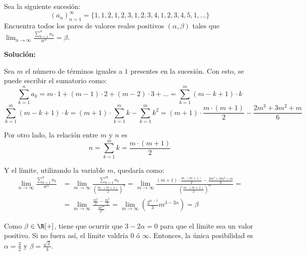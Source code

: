 \documentclass[../../main.tex]{subfiles}
\begin{document}
  \begin{shaded}
    Sea la siguiente sucesión:
    $$
    (a_n)_{n = 1}^\infty = \{1, 1, 2, 1, 2, 3, 1, 2, 3, 4, 1, 2, 3, 4, 5, 1, ...\}
    $$
    Encuentra todos los pares de valores reales positivos $(\alpha, \beta)$ tales que $ \displaystyle\lim_{n \to \infty} \displaystyle\frac{\displaystyle\sum_{k = 1}^n a_k}{n^\alpha} = \beta$.
  \end{shaded}

  \textbf{Solución:}

  Sea $m$ el número de términos iguales a $1$ presentes en la sucesión. Con esto, se puede escribir el sumatorio como:
  $$
  \sum_{k = 1}^n a_k =
  m \cdot 1 + (m - 1) \cdot 2 + (m - 2) \cdot 3 + \dots =
  \sum_{k = 1}^m (m - k + 1) \cdot k
  $$
  $$
  \sum_{k = 1}^m (m - k + 1) \cdot k =
  (m + 1) \cdot \sum_{k = 1}^m k - \sum_{k = 1}^m k^2 =
  (m + 1) \cdot \frac{m \cdot (m + 1)}{2} - \frac{2m^3 + 3m^2 + m}{6}
  $$

  Por otro lado, la relación entre $m$ y $n$ es
  $$
  n = \sum_{k = 1}^m k = \frac{m \cdot (m + 1)}{2}
  $$

  Y el límite, utilizando la variable $m$, quedaría como:
  \begin{equation*}
    \begin{split}
      \lim_{n \to \infty} \frac{\displaystyle\sum_{k = 1}^n a_k}{n^\alpha} & =
      \lim_{m \to \infty} \frac{\displaystyle\sum_{k = 1}^m a_k}{\left(\frac{m \cdot (m + 1)}{2}\right)^\alpha} = \lim_{m \to \infty} \frac{(m + 1) \cdot \frac{m \cdot (m + 1)}{2} - \frac{2m^3 + 3m^2 + m}{6}}{\left(\frac{m \cdot (m + 1)}{2}\right)^\alpha} = \\ & =
      \lim_{m \to \infty} \frac{\frac{m^3}{2} - \frac{m^3}{3}}{\frac{m^{2\alpha}}{2^\alpha}} =
      \lim_{m \to \infty} \left(\frac{2^{\alpha - 1}}{3} m^{3 - 2\alpha}\right) = \beta
    \end{split}
  \end{equation*}

  Como $\beta \in \R[+]$, tiene que ocurrir que $3 - 2\alpha = 0$ para que el límite sea un valor positivo. Si no fuera así, el límite valdría $0$ ó $\infty$. Entonces, la única posibilidad es $\alpha = \displaystyle\frac{3}{2}$ y $\beta = \displaystyle\frac{\sqrt{2}}{3}$.
\end{document}
